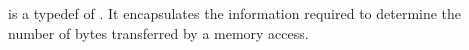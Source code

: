 
 is a typedef of . It
encapsulates the information required to determine the number of
bytes transferred by a memory access.
